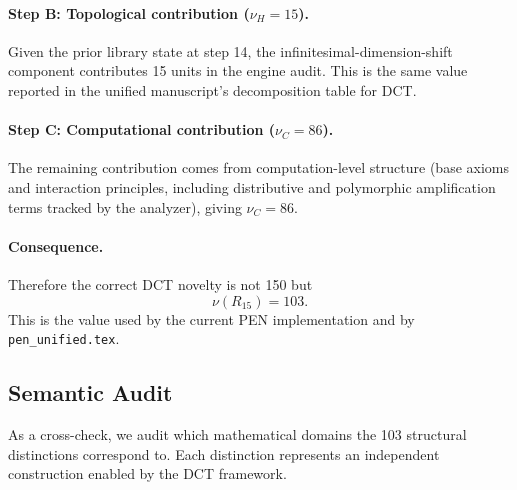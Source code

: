 \documentclass[11pt,a4paper]{article}
\theoremstyle{plain}
\theoremstyle{definition}
\theoremstyle{remark}
\begin{document}
\paragraph{Step B: Topological contribution ($\nu_H=15$).}
Given the prior library state at step 14, the infinitesimal-dimension-shift component contributes 15 units in the engine audit.
This is the same value reported in the unified manuscript's decomposition table for DCT.

\paragraph{Step C: Computational contribution ($\nu_C=86$).}
The remaining contribution comes from computation-level structure (base axioms and interaction principles, including distributive and polymorphic amplification terms tracked by the analyzer), giving $\nu_C=86$.

\paragraph{Consequence.}
Therefore the correct DCT novelty is not 150 but
\begin{equation}
    \nu(R_{15}) = 103.
\end{equation}
This is the value used by the current PEN implementation and by \texttt{pen_unified.tex}.

\subsection{Semantic Audit}

As a cross-check, we audit which mathematical domains the 103 structural distinctions correspond to.
Each distinction represents an independent construction enabled by the DCT framework.
\end{document}

